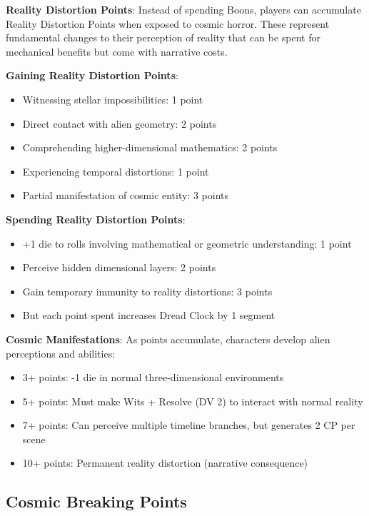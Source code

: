 \documentclass[11pt]{article}
\begin{document}
\begin{mdframed}[backgroundcolor=sanitybg]
\textbf{Reality Distortion Points}: Instead of spending Boons, players can accumulate Reality Distortion Points when exposed to cosmic horror. These represent fundamental changes to their perception of reality that can be spent for mechanical benefits but come with narrative costs.

\textbf{Gaining Reality Distortion Points}:
\begin{itemize}[leftmargin=*]
\item Witnessing stellar impossibilities: 1 point
\item Direct contact with alien geometry: 2 points
\item Comprehending higher-dimensional mathematics: 2 points
\item Experiencing temporal distortions: 1 point
\item Partial manifestation of cosmic entity: 3 points
\end{itemize}

\textbf{Spending Reality Distortion Points}:
\begin{itemize}[leftmargin=*]
\item +1 die to rolls involving mathematical or geometric understanding: 1 point
\item Perceive hidden dimensional layers: 2 points
\item Gain temporary immunity to reality distortions: 3 points
\item But each point spent increases Dread Clock by 1 segment
\end{itemize}

\textbf{Cosmic Manifestations}: As points accumulate, characters develop alien perceptions and abilities:
\begin{itemize}[leftmargin=*]
\item 3+ points: -1 die in normal three-dimensional environments
\item 5+ points: Must make Wits + Resolve (DV 2) to interact with normal reality
\item 7+ points: Can perceive multiple timeline branches, but generates 2 CP per scene
\item 10+ points: Permanent reality distortion (narrative consequence)
\end{itemize}
\end{mdframed}

\subsection*{Cosmic Breaking Points}
\end{document}
